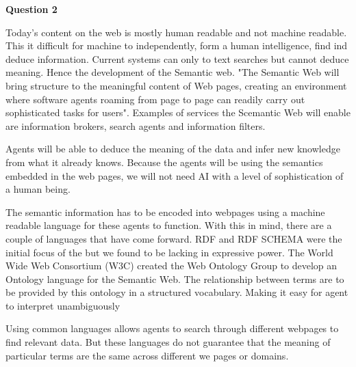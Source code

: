 \documentclass[12pt,a4paper]{article}
\begin{document}
\textbf{Question 2}
\newline

Today's content on the web is mostly human readable and not machine readable. This it difficult for machine to independently, form a human intelligence, find ind deduce information. Current systems can only to text searches but cannot deduce meaning. Hence the development of the Semantic web. "The Semantic Web will bring structure to the meaningful content of Web pages, creating an environment where software agents roaming from page to page can readily carry out sophisticated tasks for users". \citep{lee2001} Examples of services the Scemantic Web will enable are information brokers, search agents and information filters. \citep{Decker} 

Agents will be able to deduce the meaning of the data and infer new knowledge from what it already knows. Because the agents will be using the semantics embedded in the web pages, we will not need AI with a level of sophistication of a human being. \citep{lee2001}

The semantic information has to be encoded into webpages using a machine readable language for these agents to function. With this in mind, there are a couple of languages that have come forward. RDF and RDF SCHEMA were the initial focus of the but we found to be lacking in expressive power. The World Wide Web Consortium (W3C) created the Web Ontology Group to develop an Ontology language for the Semantic Web. The relationship between terms are to be provided by this ontology in a structured vocabulary. Making it easy for agent to interpret unambiguously \citep{Horrocks2003}

Using common languages allows agents to search through different webpages to find relevant data. But these languages do not guarantee that the meaning of particular terms are the same across different we pages or domains. 




\end{document}
